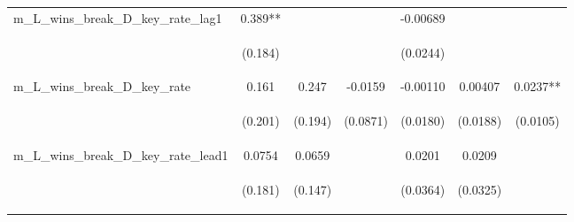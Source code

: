 \documentclass[]{article}
\begin{document}
\begin{center}
\begin{tabular}{lcccccc}
m\_L\_wins\_break\_D\_key\_rate\_lag1 & 0.389** &  &  & -0.00689 &  &  \\
\vspace{4pt} & \begin{footnotesize}(0.184)\end{footnotesize} & \begin{footnotesize}\end{footnotesize} & \begin{footnotesize}\end{footnotesize} & \begin{footnotesize}(0.0244)\end{footnotesize} & \begin{footnotesize}\end{footnotesize} & \begin{footnotesize}\end{footnotesize} \\
m\_L\_wins\_break\_D\_key\_rate & 0.161 & 0.247 & -0.0159 & -0.00110 & 0.00407 & 0.0237** \\
\vspace{4pt} & \begin{footnotesize}(0.201)\end{footnotesize} & \begin{footnotesize}(0.194)\end{footnotesize} & \begin{footnotesize}(0.0871)\end{footnotesize} & \begin{footnotesize}(0.0180)\end{footnotesize} & \begin{footnotesize}(0.0188)\end{footnotesize} & \begin{footnotesize}(0.0105)\end{footnotesize} \\
m\_L\_wins\_break\_D\_key\_rate\_lead1 & 0.0754 & 0.0659 &  & 0.0201 & 0.0209 &  \\
\vspace{4pt} & \begin{footnotesize}(0.181)\end{footnotesize} & \begin{footnotesize}(0.147)\end{footnotesize} & \begin{footnotesize}\end{footnotesize} & \begin{footnotesize}(0.0364)\end{footnotesize} & \begin{footnotesize}(0.0325)\end{footnotesize} & \begin{footnotesize}\end{footnotesize} \\

\end{tabular}
\end{center}
\end{document}
